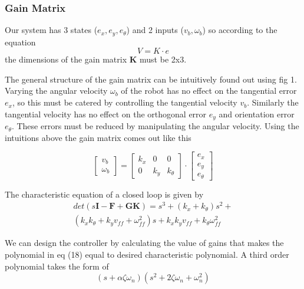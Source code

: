 \documentclass[conference]{IEEEtran}
\begin{document}
\subsubsection{Gain Matrix}
Our system has 3 states ($ e_{x},e_{y},e_{\theta}$) and 2 inputs ($v_{b},\omega_{b}$) so according to the equation
\begin{equation}\label{eq}
V=K\cdot e
\end{equation}
the dimensions of the gain matrix $\mathbf{K}$ must be 2x3.

The general structure of the gain matrix can be intuitively found out using fig 1. Varying the angular velocity $\omega_{b}$ of the robot has no effect on the tangential error $e_{x}$, so this must be catered by controlling the tangential velocity $v_{b}$. Similarly the tangential velocity has no effect on the orthogonal error $e_{y}$ and orientation error $e_{\theta}$. These errors must be reduced by manipulating the angular velocity. Using the intuitions above the gain matrix comes out like this

\begin{equation}\label{eq}
\begin{bmatrix}
v_{b}\\ 
\omega_{b}
\end{bmatrix}
=
\begin{bmatrix}
k_{x} & 0 & 0\\ 
0 & k_{y} & k_{\theta}
\end{bmatrix}
\cdot 
\begin{bmatrix}
e_{x}\\ 
e_{y}\\ 
e_{\theta}
\end{bmatrix}
\end{equation}

The characteristic equation of a closed loop is given by
\begin{equation}\label{eq}
\begin{split}
det(s\boldsymbol{I-F+GK})=s^3+(k_{x}+k_{\theta})s^2+ \\
(k_{x}k_{\theta}+k_{y}v_{ff}+\omega_{ff}^2)s+k_{x}k_{y}v_{ff}+k_{\theta}\omega_{ff}^2
\end{split}
\end{equation}

We can design the controller by calculating the value of gains that makes the polynomial in eq (18) equal to desired characteristic polynomial. A third order polynomial takes the form of
\begin{equation}\label{eq}
(s+\alpha\zeta\omega_{n})(s^2+2\zeta\omega_{n}+\omega_{n}^2)
\end{equation}
\end{document}
